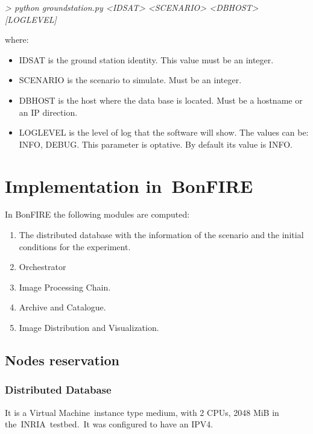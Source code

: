 \documentclass[a4paper]{article}
\newcounter{saveenum}
\newcommand\liststyleLFOxliii{%
\renewcommand\labelitemi{[F0B7?]}
\renewcommand\labelitemii{o}
\renewcommand\labelitemiii{[F0A7?]}
\renewcommand\labelitemiv{[F0B7?]}
}
\newcommand\liststyleLFOxliv{%
\renewcommand\theenumi{\arabic{enumi}}
\renewcommand\theenumii{\alph{enumii}}
\renewcommand\theenumiii{\roman{enumiii}}
\renewcommand\theenumiv{\arabic{enumiv}}
\renewcommand\labelenumi{\theenumi.}
\renewcommand\labelenumii{\theenumii.}
\renewcommand\labelenumiii{\theenumiii.}
\renewcommand\labelenumiv{\theenumiv.}
}
\begin{document}
{\itshape
{\textgreater} python groundstation.py {\textless}IDSAT{\textgreater}
{\textless}SCENARIO{\textgreater} {\textless}DBHOST{\textgreater}
[LOGLEVEL]}

where:

\liststyleLFOxliii
\begin{itemize}
\item IDSAT is the ground station identity. This value must be an
integer.\ 
\item SCENARIO is the scenario to simulate. Must be an integer.
\item DBHOST is the host where the data base is located. Must be a
hostname or an IP direction.
\item LOGLEVEL is the level of log that the software will show. The
values can be: INFO, DEBUG. This parameter is optative. By default its
value is INFO.\ 
\end{itemize}

\bigskip

\section[Implementation in\ BonFIRE]{Implementation in\ BonFIRE}
\hypertarget{Toc390097016}{}
\bigskip

In BonFIRE the following modules are computed:\ 

\liststyleLFOxliv
\setcounter{saveenum}{\value{enumi}}
\begin{enumerate}
\setcounter{enumi}{\value{saveenum}}
\item The distributed database with the information of the scenario and
the initial conditions for the experiment.
\item Orchestrator
\item Image Processing Chain.
\item Archive and Catalogue.
\item Image Distribution and Visualization.\ \ 
\end{enumerate}
\subsection[Nodes reservation]{Nodes reservation}
\hypertarget{Toc390097017}{}\subsubsection[Distributed
Database]{Distributed Database}
\hypertarget{Toc390097018}{}It is a Virtual Machine\ instance type
medium, with 2 CPUs, 2048 MiB in the\ INRIA\ testbed.\ It was
configured to have an IPV4.
\end{document}
